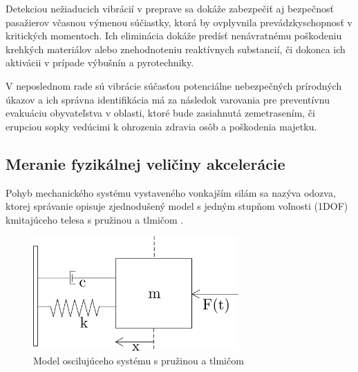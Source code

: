 Detekciou nežiaducich vibrácií v preprave sa dokáže zabezpečiť aj bezpečnosť pasažierov včasnou výmenou súčiastky, ktorá by ovplyvnila
prevádzkyschopnosť v kritických momentoch. Ich eliminácia dokáže predísť nenávratnému poškodeniu krehkých materiálov alebo
znehodnoteniu reaktívnych substancií, či dokonca ich aktivácii v prípade výbušnín a pyrotechniky.

V neposlednom rade sú vibrácie súčasťou potenciálne nebezpečných prírodných úkazov a ich správna identifikácia má za následok varovania
pre preventívnu evakuáciu obyvateľstva v oblasti, ktoré bude zasiahnutá zemetrasením, či erupciou sopky vedúcimi k ohrozenia zdravia
osôb a poškodenia majetku.

\subsection{Meranie fyzikálnej veličiny akcelerácie}
Pohyb mechanického systému vystaveného vonkajším silám sa nazýva odozva, ktorej správanie opisuje zjednodušený model s jedným stupňom
voľnosti (1DOF) kmitajúceho telesa s pružinou a tlmičom \cite{vibrations-shock}.

\begin{figure}[h]
	\centering
	\includegraphics[width=0.7\textwidth]{figures/mass-spring-damper-model.png}
	\caption{Model oscilujúceho systému s pružinou a tlmičom}
\end{figure}

